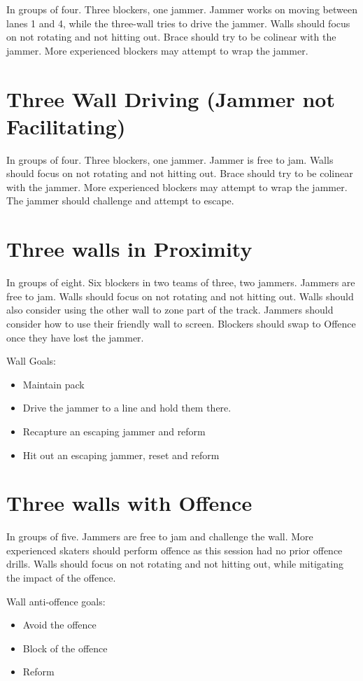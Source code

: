 \documentclass{journal}
\begin{document}
In groups of four. 
Three blockers, one jammer.
Jammer works on moving between lanes 1 and 4, while the three-wall tries to drive the jammer.
Walls should focus on not rotating and not hitting out.  
Brace should try to be colinear with the jammer. 
More experienced blockers may attempt to wrap the jammer.

\section*{Three Wall Driving (Jammer not Facilitating)}
\label{drill:three_wall:driving}

In groups of four. 
Three blockers, one jammer.
Jammer is free to jam.
Walls should focus on not rotating and not hitting out.  
Brace should try to be colinear with the jammer. 
More experienced blockers may attempt to wrap the jammer.
The jammer should challenge and attempt to escape.


\section*{Three walls in Proximity}
\label{drill:three_wall:proximity}

In groups of eight. 
Six blockers in two teams of three, two jammers.
Jammers are free to jam.
Walls should focus on not rotating and not hitting out.
Walls should also consider using the other wall to zone part of the track. 
Jammers should consider how to use their friendly wall to screen. 
Blockers should swap to Offence once they have lost the jammer.   

Wall Goals:
\begin{itemize}
\item Maintain pack
\item Drive the jammer to a line and hold them there.  
\item Recapture an escaping jammer and reform
\item Hit out an escaping jammer, reset and reform   
\end{itemize}


\section*{Three walls with Offence}
\label{drill:three_wall:offence}
In groups of five. 
Jammers are free to jam and challenge the wall.
More experienced skaters should perform offence as this session had no prior offence drills.  
Walls should focus on not rotating and not hitting out, while mitigating the impact of the offence.

Wall anti-offence goals:
\begin{itemize}
\item Avoid the offence 
\item Block of the offence 
\item Reform 
\end{itemize}
\end{document}
